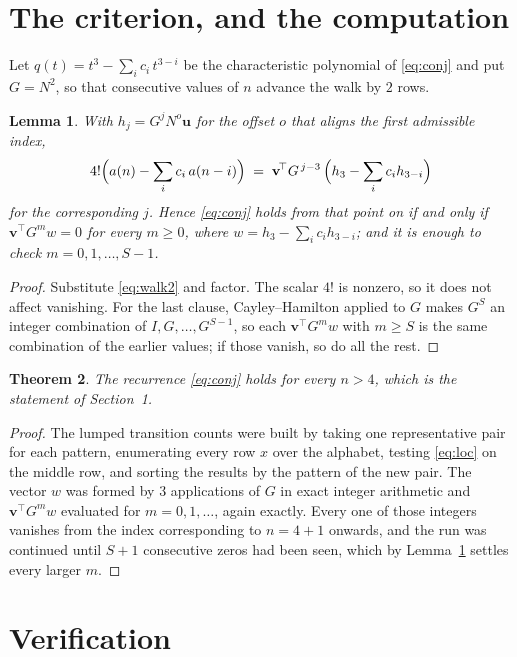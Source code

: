 \documentclass[11pt,a4paper]{article}
\theoremstyle{plain}
\newtheorem{theorem}{Theorem}
\newtheorem{lemma}[theorem]{Lemma}
\theoremstyle{definition}
\begin{document}
\section{The criterion, and the computation}

Let $q(t)=t^{3}-\sum_i c_i\,t^{3-i}$ be the characteristic polynomial of
\eqref{eq:conj} and put $G=N^{2}$, so that consecutive values of $n$ advance the
walk by $2$ rows.

\begin{lemma}\label{lem:crit}
With $h_j=G^{j}N^{o}\mathbf{u}$ for the offset $o$ that aligns the first admissible
index,
\[
4!\Bigl(a(n)-\sum_i c_i\,a(n-i)\Bigr)\;=\;\mathbf{v}^{\!\top}G^{\,j-3}\,
\Bigl(h_{3}-\sum_i c_i h_{3-i}\Bigr)
\]
for the corresponding $j$. Hence \eqref{eq:conj} holds from that point on if and only if
$\mathbf{v}^{\!\top}G^{m}w=0$ for every $m\ge0$, where
$w=h_{3}-\sum_i c_ih_{3-i}$; and it is enough to check $m=0,1,\dots,S-1$.
\end{lemma}

\begin{proof}
Substitute \eqref{eq:walk2} and factor. The scalar $4!$ is nonzero, so it does not
affect vanishing. For the last clause, Cayley--Hamilton applied to $G$ makes $G^{S}$ an
integer combination of $I,G,\dots,G^{S-1}$, so each $\mathbf{v}^{\!\top}G^{m}w$ with
$m\ge S$ is the same combination of the earlier values; if those vanish, so do all the rest.
\end{proof}

\begin{theorem}
The recurrence \eqref{eq:conj} holds for every $n>4$, which is the statement of
Section~1.
\end{theorem}

\begin{proof}
The lumped transition counts were built by taking one representative pair for each pattern,
enumerating every row $x$ over the alphabet, testing \eqref{eq:loc} on the middle
row, and sorting the results by the pattern of the new pair. The vector $w$ was formed by
$3$ applications of $G$ in exact integer arithmetic and $\mathbf{v}^{\!\top}G^{m}w$
evaluated for $m=0,1,\dots$, again exactly. Every one of those integers vanishes from the
index corresponding to $n=4+1$ onwards, and the run was continued until $S+1$
consecutive zeros had been seen, which by Lemma~\ref{lem:crit} settles every larger $m$.
\end{proof}

\section{Verification}
\end{document}
